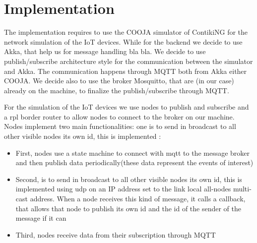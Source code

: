 \documentclass[10pt]{article}
\begin{document}
	\section{Implementation}
	
	The implementation requires to use the COOJA simulator of ContikiNG for the network simulation of the IoT devices. While for the backend we decide to use Akka, that help us for message handling bla bla. We decide to use publish/subscribe architecture style for the communication between the simulator and Akka. The communication happens through MQTT both from Akka either COOJA. We decide also to use the broker Mosquitto, that are (in our case) already on the machine, to finalize the publish/subscribe through MQTT.
	 
	For the simulation of the IoT devices we use nodes to publish and subscribe and a rpl border router to allow nodes to connect to the broker on our machine. Nodes implement two main functionalities:
	one is to send in broadcast to all other visible nodes its own id, this is implemented :
	
	\begin{itemize}
		
		\item 	First,  nodes use a state machine to connect with mqtt to the message broker and then publish data periodically(these data represent the events of interest)      
		\item   Second,	 is to send in broadcast to all other visible nodes its own id, this is implemented using udp on an IP address set to the link local all-nodes multi-cast address. When a node receives this kind of message, it calls a callback, that allows that node to publish its own id and the id of the sender of the message if it can
		\item	Third, nodes receive data from their subscription  through MQTT
	
	\end{itemize}
	
\end{document}
